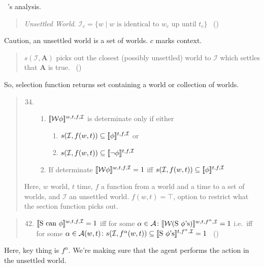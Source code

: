 \begin{note}
  ~\cite{Boylan:2020aa}'s analysis.

  \begin{quote}
    \emph{Unsettled World}. \(\mathcal{I}_{c} = \{w \mid w\text{ is identical to }w_{c}\text{ up until }t_{c}\}\)%
    \mbox{ }\hfill\mbox{(\citeyear[11]{Boylan:2020aa})}
  \end{quote}
  Caution, an unsettled world is a set of worlds.
  \(c\) marks context.%

  \begin{quote}
    \(s(\mathcal{I}, \mathbf{A})\) picks out the closest (possibly unsettled) world to \(\mathcal{I}\) which settles that \(\mathbf{A}\) is true.%
    \mbox{ }\hfill\mbox{(\citeyear[11]{Boylan:2020aa})}
  \end{quote}
  So, selection function returns set containing a world or collection of worlds.

  \begin{quote}
    \begin{enumerate}
      \setcounter{enumi}{33}
    \item
      \begin{enumerate}
      \item
        \(\sem[w,t,f,\mathcal{I}]{\mathcal{W}\phi}\) is determinate only if either
        \begin{enumerate}
        \item
          \(s(\mathcal{I}, f(w,t)) \subseteq \sem[t,f,\mathcal{I}]{\phi}\) or
        \item
          \(s(\mathcal{I}, f(w,t)) \subseteq \sem[t,f,\mathcal{I}]{\lnot\phi}\)
        \end{enumerate}
      \item
        If determinate \(\sem[w,t,f,\mathcal{I}]{\mathcal{W}\phi} = 1\) iff \(s(\mathcal{I}, f(w,t)) \subseteq \sem[t,f,\mathcal{I}]{\phi}\)
      \end{enumerate}
    \end{enumerate}
    Here, \(w\) world, \(t\) time, \(f\) a function from a world and a time to a set of worlds, and \(\mathcal{I}\) an unsettled world.
    \(f(w,t) = \top\), option to restrict what the section function picks out.
  \end{quote}

  \begin{quote}
    \begin{enumerate}
      \setcounter{enumi}{41}
    \item
      \(\sem[w,t,f,\mathcal{I}]{\text{S can }\phi} = 1\) iff for some \(\alpha \in \mathcal{A}\colon \sem[w,t,f^{\alpha},\mathcal{I}]{\mathcal{W}(\text{S }\phi\text{'s})} = 1\)\newline
      i.e.\ iff for some \(\alpha \in \mathcal{A}(w,t)\colon s(\mathcal{I}, f^{\alpha}(w,t)) \subseteq \sem[t,f^{\alpha},\mathcal{I}]{\text{S }\phi\text{'s}} = 1\)\newline
      \mbox{ }\hfill\mbox{(\citeyear[16]{Boylan:2020aa})}
    \end{enumerate}
  \end{quote}
  Here, key thing is \(f^{\alpha}\).
  We're making sure that the agent performs the action in the unsettled world.


\end{note}
